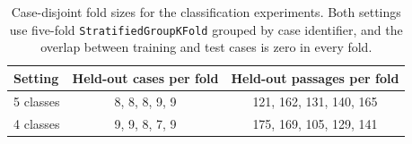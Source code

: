 \begin{table}[t]
\centering
\small
\begin{tabular}{lcc}
\toprule
Setting & Held-out cases per fold & Held-out passages per fold \\
\midrule
5 classes & 8, 8, 8, 9, 9 & 121, 162, 131, 140, 165 \\
4 classes & 9, 9, 8, 7, 9 & 175, 169, 105, 129, 141 \\
\bottomrule
\end{tabular}
\caption{Case-disjoint fold sizes for the classification experiments. Both settings use five-fold \texttt{StratifiedGroupKFold} grouped by case identifier, and the overlap between training and test cases is zero in every fold.}
\label{tab:classification_fold_summary}
\end{table}
